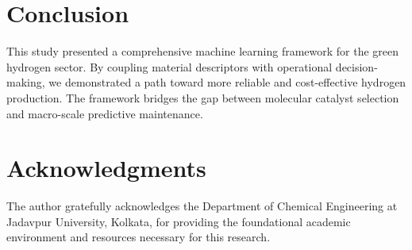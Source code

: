\documentclass[preprint,12pt]{elsarticle}
\begin{document}
\section{Conclusion}
This study presented a comprehensive machine learning framework for the green hydrogen sector. By coupling material descriptors with operational decision-making, we demonstrated a path toward more reliable and cost-effective hydrogen production. The framework bridges the gap between molecular catalyst selection and macro-scale predictive maintenance.

\section*{Acknowledgments}
The author gratefully acknowledges the Department of Chemical Engineering at Jadavpur University, Kolkata, for providing the foundational academic environment and resources necessary for this research.
\end{document}
